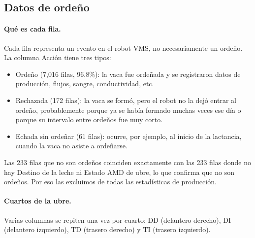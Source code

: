 \documentclass[11pt,letterpaper,DIV=12]{scrartcl}
\begin{document}
\subsection{Datos de ordeño}

\paragraph{Qué es cada fila.} Cada fila representa un evento en el robot VMS, no necesariamente un ordeño. La columna Acción tiene tres tipos:
\begin{itemize}
  \item Ordeño (7,016 filas, 96.8\%): la vaca fue ordeñada y se registraron datos de producción, flujos, sangre, conductividad, etc.
  \item Rechazada (172 filas): la vaca se formó, pero el robot no la dejó entrar al ordeño, probablemente porque ya se había formado muchas veces ese día o porque su intervalo entre ordeños fue muy corto.
  \item Echada sin ordeñar (61 filas): ocurre, por ejemplo, al inicio de la lactancia, cuando la vaca no asiste a ordeñarse.
\end{itemize}
Las 233 filas que no son ordeños coinciden exactamente con las 233 filas donde no hay Destino de la leche ni Estado AMD de ubre, lo que confirma que no son ordeños. Por eso las excluimos de todas las estadísticas de producción.

\paragraph{Cuartos de la ubre.} Varias columnas se repiten una vez por cuarto: DD (delantero derecho), DI (delantero izquierdo), TD (trasero derecho) y TI (trasero izquierdo).
\end{document}
